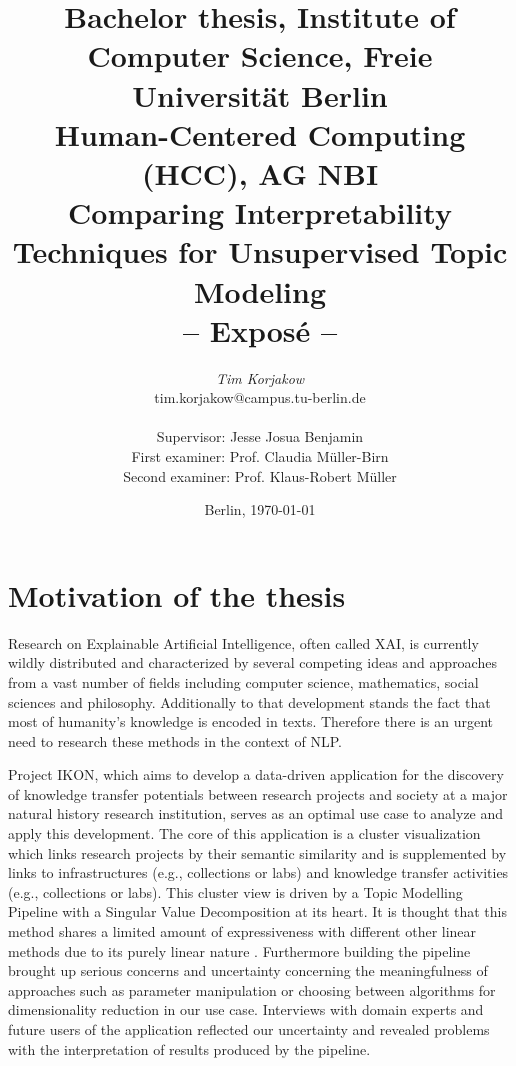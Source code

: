 \documentclass[pdftex,a4paper,12pt]{scrartcl}
\title{
{\small Bachelor thesis, Institute of Computer Science, Freie Universität Berlin}\\
{\small Human-Centered Computing (HCC), AG NBI}\\
[6ex]
{\LARGE Comparing Interpretability Techniques for Unsupervised Topic Modeling}\\
{\normalsize-- Exposé --}}
\author{
{\emph{\normalsize Tim Korjakow}}\\
{\normalsize tim.korjakow@campus.tu-berlin.de}\\\\
{\normalsize Supervisor: Jesse Josua Benjamin } \\
{\normalsize First examiner: Prof. Claudia Müller-Birn} \\
{\normalsize Second examiner: Prof. Klaus-Robert Müller } \\
}
\date{\normalsize Berlin, \today}
\newcommand{\blankpage}{
\newpage
\thispagestyle{empty}
\mbox{}
\newpage
}
\begin{document}
\maketitle 

\thispagestyle{empty}  %

\blankpage


\setcounter{page}{1} %

\section{Motivation of the thesis} 

Research on Explainable Artificial Intelligence, often called XAI, is currently wildly distributed and characterized by several competing ideas and approaches from a vast number of fields including computer science, mathematics, social sciences and philosophy. Additionally to that development stands the fact that most of humanity's knowledge is encoded in texts. Therefore there is an urgent need to research these methods in the context of NLP.

Project IKON, which aims to develop a data-driven application for the discovery of knowledge transfer potentials between research projects and society at a major natural history research institution, serves as an optimal use case to analyze and apply this development. The core of this application is a cluster visualization which links research projects by their semantic similarity and is supplemented by links to infrastructures (e.g., collections or labs) and knowledge transfer activities (e.g., collections or labs). This cluster view is driven by a Topic Modelling Pipeline with a Singular Value Decomposition at its heart. It is thought that this method shares a limited amount of expressiveness with different other linear methods due to its purely linear nature \cite{arrasWhatRelevantText2017}. Furthermore building the pipeline brought up serious concerns and uncertainty concerning the meaningfulness of approaches such as parameter manipulation or choosing between algorithms for dimensionality reduction \cite{benjaminTransparencyMediationMeaning2018} in our use case. Interviews with domain experts and future users of the application reflected our uncertainty and revealed problems with the interpretation of results produced by the pipeline.
\end{document}
